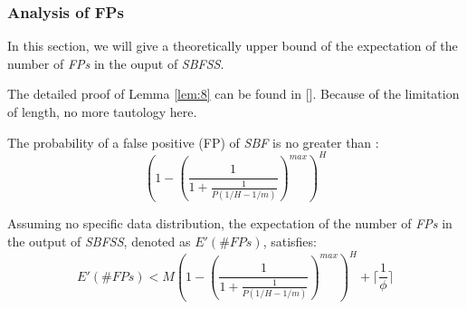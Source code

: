 \documentclass[conference]{IEEEtran}
\begin{document}
\subsubsection{\textbf{Analysis of FPs}}
In this section, we will give a theoretically upper bound of the expectation of the number of \emph{FPs} in the ouput of \emph{SBFSS}.\par
The detailed proof of Lemma \ref{lem:8} can be found in []. Because of the limitation of length, no more tautology here.
\begin{lemma}\label{lem:8}
The probability of a false positive (FP) of \emph{SBF} is no greater than :
\begin{equation}
(1-(\frac{1}{1+\frac{1}{P(1/H-1/m)}})^{max})^H
\end{equation}
\end{lemma}

\begin{theorem}\label{thm:6}
Assuming no specific data distribution, the expectation of the number of \emph{FPs} in the output of \emph{SBFSS}, denoted as $E'(\#FPs)$, satisfies:
\begin{equation}\label{eq:17}
E'(\#FPs)<M(1-(\frac{1}{1+\frac{1}{P(1/H-1/m)}})^{max})^H + \lceil\frac{1}{\phi}\rceil
\end{equation}
\end{theorem}
\end{document}

